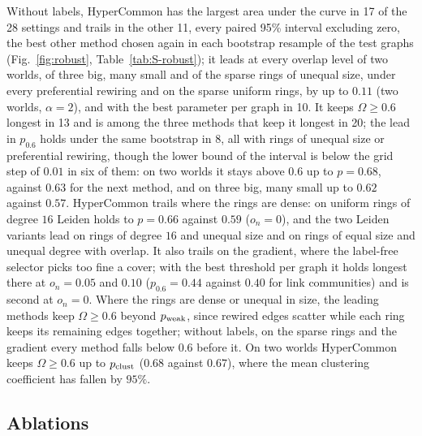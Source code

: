 Without labels, HyperCommon has the largest area under the curve in 17 of the 28 settings and trails in the other 11, every paired 95\% interval excluding zero, the best other method chosen again in each bootstrap resample of the test graphs (Fig.~\ref{fig:robust}, Table~\ref{tab:S-robust}); it leads at every overlap level of two worlds, of three big, many small and of the sparse rings of unequal size, under every preferential rewiring and on the sparse uniform rings, by up to $0.11$ (two worlds, $\alpha=2$), and with the best parameter per graph in 10. It keeps $\Omega\ge0.6$ longest in 13 and is among the three methods that keep it longest in 20; the lead in $p_{0.6}$ holds under the same bootstrap in 8, all with rings of unequal size or preferential rewiring, though the lower bound of the interval is below the grid step of $0.01$ in six of them: on two worlds it stays above $0.6$ up to $p=0.68$, against $0.63$ for the next method, and on three big, many small up to $0.62$ against $0.57$. HyperCommon trails where
the rings are dense: on uniform rings of degree $16$ Leiden holds to $p=0.66$
against $0.59$ ($o_n=0$), and the two Leiden variants lead on rings of degree $16$ and
unequal size and on rings of equal size and unequal degree with overlap. It also trails on the gradient,
where the label-free selector picks too fine a cover; with the best threshold per graph it holds longest there at $o_n=0.05$ and $0.10$ ($p_{0.6}=0.44$ against $0.40$ for link communities) and is second at $o_n=0$. Where the rings are dense or unequal in size, the leading methods keep $\Omega\ge0.6$ beyond $p_{\rm weak}$, since rewired edges scatter while each ring keeps its remaining edges together; without labels, on the sparse rings and the gradient every method falls below $0.6$ before it. On two worlds HyperCommon keeps $\Omega\ge0.6$ up to $p_{\rm clust}$
($0.68$ against $0.67$), where the mean clustering coefficient has fallen by $95\%$.

\subsection{Ablations}
\label{sec:ablations}

